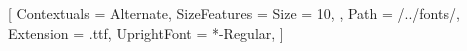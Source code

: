 \usepackage{fontspec}

\setmonofont{FiraCode}[
    Contextuals = Alternate,
	SizeFeatures = {
	    Size = 10,
    },
	Path = \pwd/../fonts/,
	Extension = .ttf,
    UprightFont = *-Regular,
]

\usepackage[verbatim]{lstfiracode}
